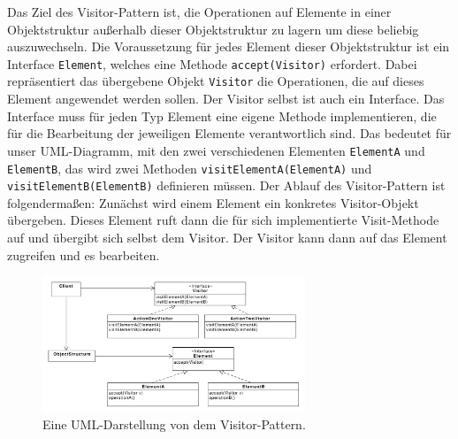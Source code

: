 
Das Ziel des Visitor-Pattern ist, die Operationen auf Elemente in einer Objektstruktur außerhalb dieser Objektstruktur zu lagern um diese beliebig auszuwechseln.
Die Voraussetzung für jedes Element dieser Objektstruktur ist ein Interface \texttt{Element}, welches eine Methode \texttt{accept(Visitor)} erfordert. Dabei repräsentiert das übergebene Objekt \texttt{Visitor} die Operationen, die auf dieses Element angewendet werden sollen. Der Visitor selbst ist auch ein Interface. Das Interface muss für jeden Typ Element eine eigene Methode implementieren, die für die Bearbeitung der jeweiligen Elemente verantwortlich sind. Das bedeutet für unser UML-Diagramm, mit den zwei verschiedenen Elementen \texttt{ElementA} und \texttt{ElementB}, das wird zwei Methoden \texttt{visitElementA(ElementA)} und \texttt{visitElementB(ElementB)} definieren müssen. 
Der Ablauf des Visitor-Pattern ist folgendermaßen: Zunächst wird einem Element ein konkretes Visitor-Objekt übergeben. Dieses Element ruft dann die für sich implementierte Visit-Methode auf und übergibt sich selbst dem Visitor. Der Visitor kann dann auf das Element zugreifen und es bearbeiten.

\begin{figure}[htbp]
\centering
\includegraphics[width=0.7\textwidth]{./paper/visitor/visitor}
\caption{Eine UML-Darstellung von dem Visitor-Pattern.}
\label{visitordiagramm}
\end{figure} 
